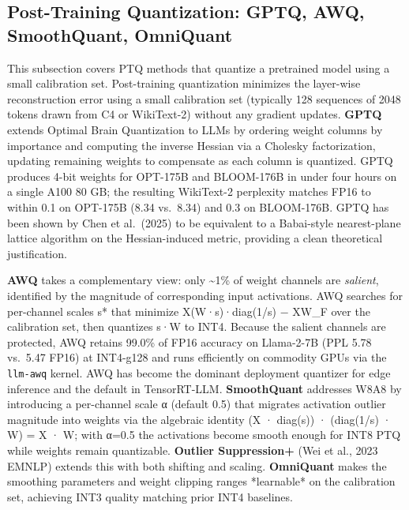 \documentclass{article}
\begin{document}
\subsection{Post-Training Quantization: GPTQ, AWQ, SmoothQuant, OmniQuant}\label{post-training-quantization-gptq-awq-smoothquant-omniquant}

This subsection covers PTQ methods that quantize a pretrained model using a small calibration set. Post-training quantization minimizes the layer-wise reconstruction error using a small calibration set (typically 128 sequences of 2048 tokens drawn from C4 or WikiText-2) without any gradient updates. \textbf{GPTQ} \citep{frantar2023gptqaccurateposttr} extends Optimal Brain Quantization to LLMs by ordering weight columns by importance and computing the inverse Hessian via a Cholesky factorization, updating remaining weights to compensate as each column is quantized. GPTQ produces 4-bit weights for OPT-175B and BLOOM-176B in under four hours on a single A100 80 GB; the resulting WikiText-2 perplexity matches FP16 to within 0.1 on OPT-175B (8.34 vs.~8.34) and 0.3 on BLOOM-176B. GPTQ has been shown by Chen et al.~(2025) to be equivalent to a Babai-style nearest-plane lattice algorithm on the Hessian-induced metric, providing a clean theoretical justification.

\textbf{AWQ} \citep{lin20242023} takes a complementary view: only \textasciitilde1\% of weight channels are \emph{salient}, identified by the magnitude of corresponding input activations. AWQ searches for per-channel scales s* that minimize \textbar\textbar X(W·s)·diag(1/s) − XW\textbar\textbar\_F over the calibration set, then quantizes s·W to INT4. Because the salient channels are protected, AWQ retains 99.0\% of FP16 accuracy on Llama-2-7B (PPL 5.78 vs.~5.47 FP16) at INT4-g128 and runs efficiently on commodity GPUs via the \texttt{llm-awq} kernel. AWQ has become the dominant deployment quantizer for edge inference and the default in TensorRT-LLM. \textbf{SmoothQuant} \citep{xiao20232022} addresses W8A8 by introducing a per-channel scale α (default 0.5) that migrates activation outlier magnitude into weights via the algebraic identity (X · diag(s)) · (diag(1/s) · W) = X · W; with α=0.5 the activations become smooth enough for INT8 PTQ while weights remain quantizable. \textbf{Outlier Suppression+} (Wei et al., 2023 EMNLP) extends this with both shifting and scaling. \textbf{OmniQuant} \citep{shao20242023} makes the smoothing parameters and weight clipping ranges *learnable* on the calibration set, achieving INT3 quality matching prior INT4 baselines.
\end{document}
